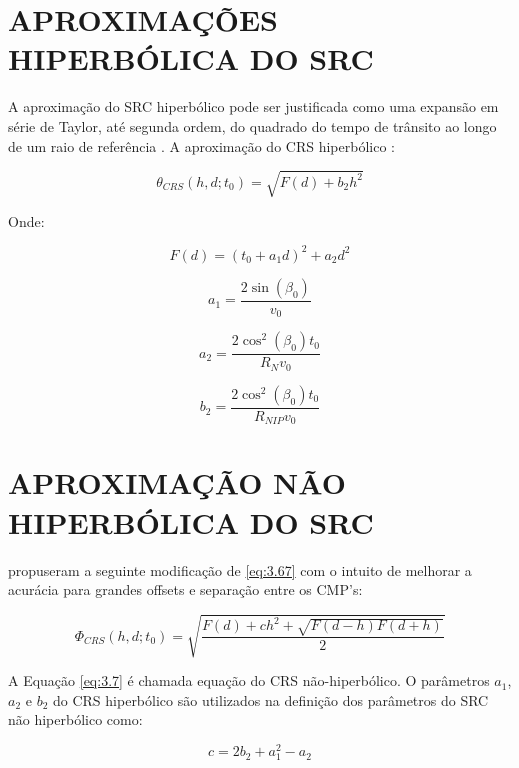 \section{APROXIMAÇÕES HIPERBÓLICA DO SRC}

A aproximação do SRC hiperbólico pode ser justificada como
uma expansão em série de Taylor, até segunda ordem, do quadrado do tempo de trânsito 
ao longo de um raio de referência \cite{fomel1}. A aproximação do CRS hiperbólico \cite{jager}:

\begin{equation}
\label{eq:3.2}
 \theta_{CRS}(h,d;t_0)=\sqrt{F(d)+b_2h^2}
\end{equation}


Onde:

\begin{equation}
\label{eq:3.3}
 F(d)=(t_0+a_1d)^2+a_2d^2
\end{equation}

\begin{equation}
\label{eq:3.4}
 a_1=\frac{2\sin(\beta_0)}{v_0}
\end{equation}

\begin{equation}
\label{eq:3.5}
 a_2=\frac{2\cos^2(\beta_0)t_0}{R_Nv_0}
\end{equation}

\begin{equation}
\label{eq:3.6}
 b_2=\frac{2\cos^2(\beta_0)t_0}{R_{NIP}v_0}
\end{equation}

\section{APROXIMAÇÃO NÃO HIPERBÓLICA DO SRC}

\cite{fomel1} propuseram a seguinte modificação de \ref{eq:3.67} com o intuito de melhorar a acurácia
para grandes offsets e separação entre os CMP's:

\begin{equation}
\label{eq:3.7}
 \Phi_{CRS}(h,d;t_0)=\sqrt{\frac{F(d)+ch^2+\sqrt{F(d-h)F(d+h)}}{2}}
\end{equation}


A Equação \ref{eq:3.7} é chamada equação do CRS não-hiperbólico. O parâmetros 
$a_1$, $a_2$ e $b_2$
do CRS hiperbólico são utilizados na definição
dos parâmetros do SRC não hiperbólico como:

\begin{equation}
\label{eq:3.8}
 c=2b_2+a_1^2-a_2
\end{equation}

